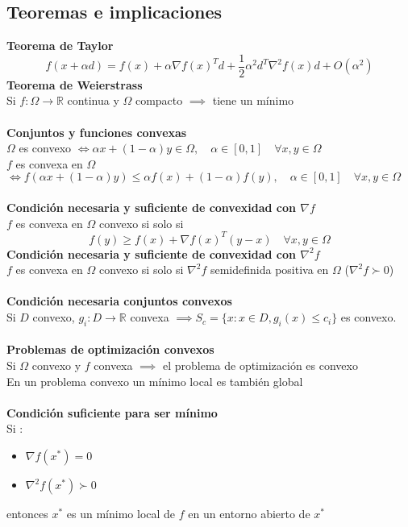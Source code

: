 \documentclass{myclass}
\newcommand{\R}{\mathbb{R}}
\renewcommand{\O}{\Omega}
\newcommand{\N}{\nabla}
\begin{document}
\subsection{Teoremas e implicaciones}
\textbf{Teorema de Taylor} 
$$
f(x + \alpha d) = f(x) + \alpha \nabla f(x)^Td + \frac{1}{2} \alpha^2d^T\nabla^2f(x)d + O(\alpha^2)
$$
\textbf{Teorema de Weierstrass} \\
Si $f: \Omega \to \mathbb{R} $ continua y $\Omega$ compacto $\implies$ tiene un mínimo \\
\\
\textbf{Conjuntos y funciones convexas} \\
$\Omega$ es convexo $\iff \alpha x + (1-\alpha) y \in \Omega, \quad \alpha\in [0, 1] \quad \forall x, y \in \Omega $ \\
$f$ es convexa en $\Omega$ $\iff f(\alpha x + (1-\alpha) y) \leq \alpha f(x) + (1-\alpha)f(y), \quad \alpha\in [0, 1] \quad \forall x, y \in \Omega $ \\
\\
\textbf{Condición necesaria y suficiente de convexidad con $\N f$}\\
$f$ es convexa en $\Omega$ convexo si solo si
$$
f(y)\geq f(x) + \N f(x)^T(y-x) \quad \forall x, y \in \O
$$
\textbf{Condición necesaria y suficiente de convexidad con $\N^2 f$}\\
$f$ es convexa en $\Omega$ convexo si solo si $\N^2f$ semidefinida positiva en $\Omega$ ($\N^2f \succ 0$) \\
\\
\textbf{Condición necesaria conjuntos convexos}\\
Si $D$ convexo, $g_i: D\to \R$ convexa $\implies S_c = \{x:x\in D, g_i(x)\leq c_i\}$ es convexo. \\
\\
\textbf{Problemas de optimización convexos} \\
Si $\Omega$ convexo y $f$ convexa $\implies$ el problema de optimización es convexo \\
En un problema convexo un mínimo local es también global \\
\\
\textbf{Condición suficiente para ser mínimo} \\
Si :
\begin{itemize}
    \item $\N f(x^*) = 0$
    \item $\N^2 f(x^*) \succ 0$
\end{itemize}
entonces $x^*$ es un mínimo local de $f$ en un entorno abierto de $x^*$
\end{document}
